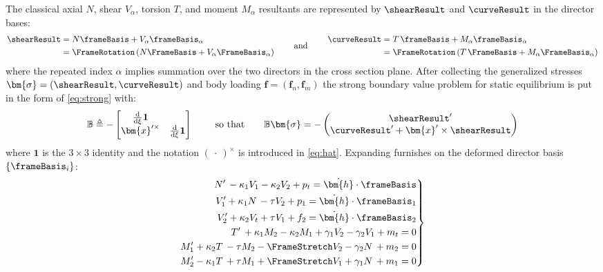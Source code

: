 The classical axial \(N\), shear \(V_\alpha\), torsion \(T\), and moment \(M_\alpha\) resultants 
are represented by \(\shearResult\) and \(\curveResult\) in the director bases:
\begin{equation*}
  \begin{aligned}
    \shearResult
    &= N \frameBasis + V_\alpha \frameBasis_\alpha \\
    &= \FrameRotation\left( N\FrameBasis +  V_\alpha \FrameBasis_\alpha \right) \\
  \end{aligned}
  \qquad \text{ and }\qquad
  \begin{aligned}
    \curveResult
    &= T\, \frameBasis + M_\alpha \frameBasis_\alpha \\
    &= \FrameRotation\left( T\, \FrameBasis + M_\alpha \FrameBasis_\alpha \right) \\
  \end{aligned}
\end{equation*}
where the repeated index \(\alpha\) implies summation over the two
directors %
in the cross section plane.
After collecting the generalized stresses \(\bm{\sigma} = (\shearResult, \curveResult)\)
and body loading \(\bm{f} = (\bm{f}_n, \bm{f}_m)\) 
the strong boundary value problem for static equilibrium is put in the form 
of \eqref{eq:strong} with:
\begin{equation} 
  \mathbb{B} \triangleq -\begin{bmatrix}
    \frac{\mathrm{d}}{\mathrm{d}\xi}\mathbf{1} &  \\
    \bm{x}^{\prime\times} & \frac{\mathrm{d}}{\mathrm{d}\xi}\mathbf{1}
  \end{bmatrix}
  \qquad\text{ so that}\qquad
  \mathbb{B}\bm{\sigma} = -\begin{pmatrix}
    \shearResult^{\prime} \\
    \curveResult^{\prime} + \bm{x}^{\prime}\times \shearResult
  \end{pmatrix}
\label{eq:cosserat-B}
\end{equation}
where $\mathbf{1}$ is the $3 \times 3$ identity and the notation $(~\cdot~)^{\times}$
is introduced in \eqref{eq:hat}.
%
\iffalse
Expanding furnishes on the deformed director basis \(\{\frameBasis_i\}\):
$$
\left.
\begin{aligned}
N^{\prime}\,-\kappa_1 V_1-\kappa_2 V_2+p_t = \dot{\bm{h}}\cdot\frameBasis \\
V_1^{\prime}+\kappa_1 N\,- \tau V_2 + p_1  = \dot{\bm{h}}\cdot\frameBasis_1 \\
V_2^{\prime}+\kappa_2 V_t+ \tau V_1 + f_2  = \dot{\bm{h}}\cdot\frameBasis_2 \\
T^{\prime}\,+\kappa_1 M_2-\kappa_2 M_1 + \gamma_1 V_2-\gamma_2 V_1 + m_t=0 \\
M_1^{\prime} + \kappa_2 T \, - \tau M_2 - \FrameStretch V_2 - \gamma_2 N \, + m_2 = 0 \\
M_2^{\prime} - \kappa_1 T \, + \tau M_1 + \FrameStretch V_1 + \gamma_1 N \, + m_1 = 0 \\
\end{aligned}
\right\}
$$
